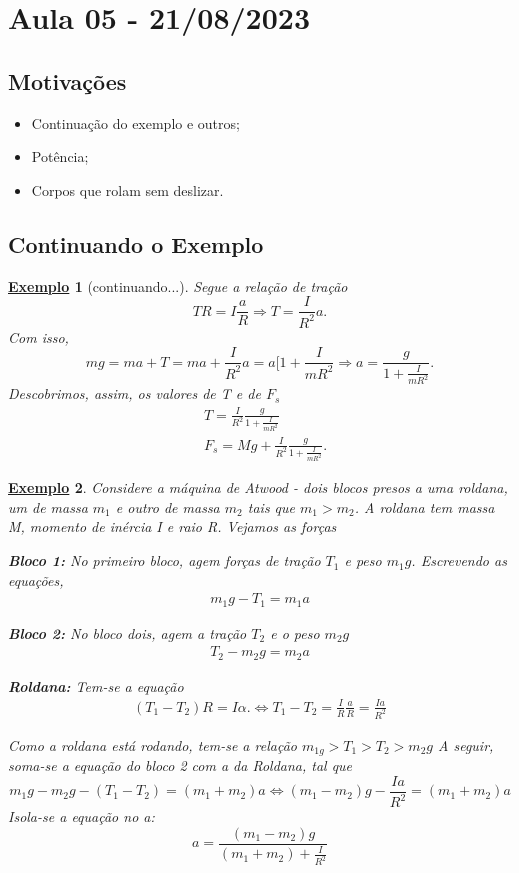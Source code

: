 \documentclass{article}
\newtheorem{example}{\underline{Exemplo}}
\begin{document}
\section{Aula 05 - 21/08/2023}
\subsection{Motivações}
\begin{itemize}
  \item Continuação do exemplo e outros;
  \item Potência;
  \item Corpos que rolam sem deslizar.
\end{itemize}
\subsection{Continuando o Exemplo}
\begin{example}[continuando...]
  Segue a relação de tração 
  \[
    TR = I \frac{a}{R} \Rightarrow T = \frac{I}{R^{2}}a.
  \] 
  Com isso, 
  \[
    mg = ma + T = ma + \frac{I}{R^{2}}a = a[1 + \frac{I}{mR^{2}} \Rightarrow a = \frac{g}{1 + \frac{I}{mR^{2}}}.
  \]
  Descobrimos, assim, os valores de T e de \(F_{s}\)
  \begin{align*}
   &T = \frac{I}{R^{2}}\frac{g}{1+ \frac{I}{mR^{2}}}\\
   &F_{s} = Mg + \frac{I}{R^{2}}\frac{g}{1+\frac{I}{mR^{2}}}.
  \end{align*}
\end{example} 
\begin{example}
  Considere a máquina de Atwood - dois blocos presos a uma roldana, um de massa \(m_{1}\) e outro de massa \(m_{2}\) tais que \(m_{1} > m_{2}\).
  A roldana tem massa M, momento de inércia I e raio R. Vejamos as forças

  \textbf{Bloco 1:}
  No primeiro bloco, agem forças de tração \(T_{1}\) e peso \(m_{1}g\). Escrevendo as equações,
  \begin{align*}
    m_{1}g - T_{1} = m_{1}a
  \end{align*}

  \textbf{Bloco 2:}
  No bloco dois, agem a tração \(T_{2}\) e o peso \(m_{2}g\)
  \begin{align*}
    T_{2}-m_{2}g = m_{2}a
  \end{align*}

  \textbf{Roldana:}
  Tem-se a equação 
  \begin{align*}
    (T_{1} - T_{2})R = I\alpha. \Longleftrightarrow T_{1} - T_{2} = \frac{I}{R}\frac{a}{R} = \frac{Ia}{R^{2}}
  \end{align*}

  Como a roldana está rodando, tem-se a relação \(m_{1g} > T_{1} > T_{2} > m_{2}g\)
  A seguir, soma-se a equação do bloco 2 com a da Roldana, tal que 
  \[
    m_{1}g - m_{2}g - (T_{1}-T_{2}) = (m_{1}+m_{2})a \Longleftrightarrow (m_{1}-m_{2})g - \frac{Ia}{R^{2}} = (m_{1}+m_{2})a
  \]
  Isola-se a equação no a: 
  \[
    a = \frac{(m_{1}-m_{2})g}{(m_{1}+m_{2})+\frac{I}{R^{2}}}
  \]
\end{example}
\end{document}
